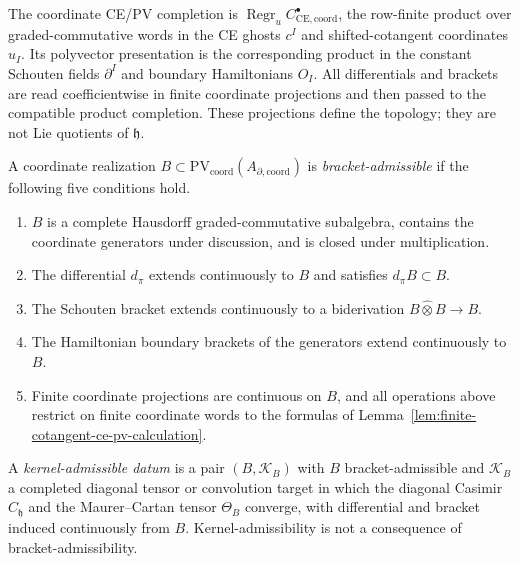 \documentclass[11pt]{memoir}
\begin{document}
\begin{defn}\label{defn:formal-disk-ce-pv-completion}
  The coordinate CE/PV completion is
  \(\operatorname{Regr}_u C^\bullet_{\mathrm{CE},\mathrm{coord}}\),
  the row-finite product over graded-commutative words in the CE ghosts
  \(c^I\) and shifted-cotangent coordinates \(u_I\).  Its polyvector
  presentation is the corresponding product in the constant Schouten
  fields \(\partial^I\) and boundary Hamiltonians \(O_I\).  All
  differentials and brackets are read coefficientwise in finite coordinate
  projections and then passed to the compatible product completion.
  These projections define the topology; they are not Lie quotients of
  \(\mathfrak h\).
\end{defn}

\begin{defn}\label{defn:bracket-kernel-admissible}
  A coordinate realization
  \(B\subset\mathrm{PV}_{\mathrm{coord}}(A_{\partial,\mathrm{coord}})\)
  is \emph{bracket-admissible} if the following five conditions hold.
  \begin{enumerate}
    \item \(B\) is a complete Hausdorff graded-commutative subalgebra,
      contains the coordinate generators under discussion, and is closed
      under multiplication.
    \item The differential \(d_\pi\) extends continuously to \(B\) and
      satisfies \(d_\pi B\subset B\).
    \item The Schouten bracket extends continuously to a biderivation
      \(B\widehat\otimes B\to B\).
    \item The Hamiltonian boundary brackets of the generators extend
      continuously to \(B\).
    \item Finite coordinate projections are continuous on \(B\), and all
      operations above restrict on finite coordinate words to the
      formulas of Lemma~\ref{lem:finite-cotangent-ce-pv-calculation}.
  \end{enumerate}

  A \emph{kernel-admissible datum} is a pair \((B,\mathcal K_B)\) with
  \(B\) bracket-admissible and \(\mathcal K_B\) a completed diagonal
  tensor or convolution target in which the diagonal Casimir
  \(C_{\mathfrak h}\) and the Maurer--Cartan tensor \(\Theta_B\)
  converge, with differential and bracket induced continuously from
  \(B\).  Kernel-admissibility is not a consequence of
  bracket-admissibility.


\end{defn}
\end{document}
